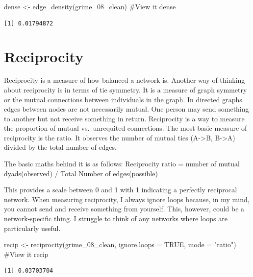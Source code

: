 \documentclass[
  letterpaper,
  DIV=11,
  numbers=noendperiod]{scrreprt}
\newenvironment{Shaded}{\begin{snugshade}}{\end{snugshade}}
\newcommand{\AttributeTok}[1]{\textcolor[rgb]{0.40,0.45,0.13}{#1}}
\newcommand{\CommentTok}[1]{\textcolor[rgb]{0.37,0.37,0.37}{#1}}
\newcommand{\ConstantTok}[1]{\textcolor[rgb]{0.56,0.35,0.01}{#1}}
\newcommand{\FunctionTok}[1]{\textcolor[rgb]{0.28,0.35,0.67}{#1}}
\newcommand{\NormalTok}[1]{\textcolor[rgb]{0.00,0.23,0.31}{#1}}
\newcommand{\OtherTok}[1]{\textcolor[rgb]{0.00,0.23,0.31}{#1}}
\newcommand{\StringTok}[1]{\textcolor[rgb]{0.13,0.47,0.30}{#1}}
\begin{document}
\begin{Shaded}
\begin{Highlighting}[]
\NormalTok{  dense }\OtherTok{\textless{}{-}} \FunctionTok{edge\_density}\NormalTok{(grime\_08\_clean)}
\CommentTok{\#View it}
\NormalTok{dense}
\end{Highlighting}
\end{Shaded}

\begin{verbatim}
[1] 0.01794872
\end{verbatim}

\section{Reciprocity}\label{reciprocity}

Reciprocity is a measure of how balanced a network is. Another way of
thinking about reciprocity is in terms of tie symmetry. It is a measure
of graph symmetry or the mutual connections between individuals in the
graph. In directed graphs edges between nodes are not necessarily
mutual. One person may send something to another but not receive
something in return. Reciprocity is a way to measure the proportion of
mutual vs.~unrequited connections. The most basic measure of reciprocity
is the ratio. It observes the number of mutual ties (A-\textgreater B,
B-\textgreater A) divided by the total number of edges.

The basic maths behind it is as follows: Reciprocity ratio = number of
mutual dyads(observed) / Total Number of edges(possible)

This provides a scale between 0 and 1 with 1 indicating a perfectly
reciprocal network. When measuring reciprocity, I always ignore loops
because, in my mind, you cannot send and receive something from
yourself. This, however, could be a network-specific thing. I struggle
to think of any networks where loops are particularly useful.

\begin{Shaded}
\begin{Highlighting}[]
\NormalTok{recip }\OtherTok{\textless{}{-}} \FunctionTok{reciprocity}\NormalTok{(grime\_08\_clean, }\AttributeTok{ignore.loops =} \ConstantTok{TRUE}\NormalTok{, }\AttributeTok{mode =} \StringTok{"ratio"}\NormalTok{)}
\CommentTok{\#View it}
\NormalTok{recip}
\end{Highlighting}
\end{Shaded}

\begin{verbatim}
[1] 0.03703704
\end{verbatim}
\end{document}

